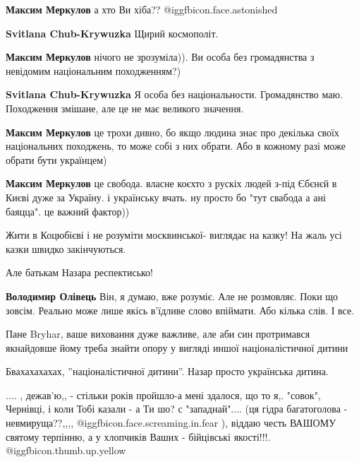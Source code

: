 \begin{itemize}
\begin{itemize}
\textbf{Максим Меркулов} а хто Ви хіба??  @igg{fbicon.face.astonished} 

\textbf{Svitlana Chub-Krywuzka} Щирий космополіт.

\textbf{Максим Меркулов} нічого не зрозуміла)). Ви особа без громадянства з невідомим національним походженням?)

\textbf{Svitlana Chub-Krywuzka} Я особа без національности. Громадянство маю. Походження змішане, але це не має великого значення.

\textbf{Максим Меркулов} це трохи дивно, бо якщо людина знає про декілька своїх національних походжень, то може собі з них обрати. Або в кожному разі може обрати бути українцем)

\textbf{Максим Меркулов} це свобода. власне коєхто з рускіх людей з-під Єбєнєй в Києві дуже за Україну. і українську вчать. ну просто бо "тут свабода а ані баяцца". це важний фактор))
\end{itemize} %


Жити в Коцюбієві і не розуміти москвинської- виглядає на казку! На жаль усі казки швидко закінчуються.

Але батькам Назара респектисько!

\begin{itemize} %
\textbf{Володимир Олівець} Він, я думаю, вже розуміє. Але не розмовляє. Поки що зовсім. Реально може лише якісь в'їдливе слово впіймати. Або кілька слів. І все.

Пане Bryhar, ваше виховання дуже важливе, але аби син протримався якнайдовше йому треба знайти опору у вигляді иншої націоналістичної дитини

Бвахахахахах, ''націоналістичної дитини''.
Назар просто українська дитина.
\end{itemize} %


.... , дежав'ю,, - стільки років пройшло-а мені здалося, що то я,. "совок",
Чернівці, і коли Тобі казали - а Ти шо? с "западнай".... (ця гідра багатоголова
- невмируща??,,,,  @igg{fbicon.face.screaming.in.fear} ), віддаю честь ВАШОМУ святому терпінню, а у хлопчиків
Ваших - бійцівські якості!!!.  @igg{fbicon.thumb.up.yellow} 🔱


\end{itemize}

